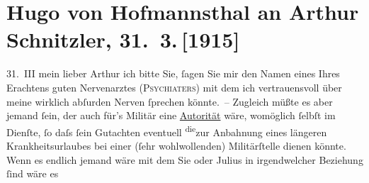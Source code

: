 

         
         \renewcommand{\erwaehntePersonen}{Personen: Hugo von Hofmannsthal, Hugo August von Hofmannsthal, Julius Schnitzler}
         \renewcommand{\erwaehnteOrte}{Orte: Rodaun, Wien}
         \renewcommand{\erwaehnteWerke}{}
               \section[Hugo von Hofmannsthal an Arthur Schnitzler, 31. 3. {[}1915{]}]{ Hugo von Hofmannsthal an Arthur Schnitzler, 31. 3. {[}1915{]}}\nopagebreak{}\rehead{ }\begin{ledgroupsized}[t]{13cm}\normalsize\beginnumbering{} \toendnotes[C]{\smallbreak\pagebreak[2]} 
\toendnotes[C]{\smallbreak}\pstart
           \raggedleft{}{\pb}31. III\pend
           \pstart{}mein lieber Arthur\pend\pstart
           ich bitte Sie, ſagen Sie mir den Namen eines Ihres Erachtens guten Nervenarztes (\textsc{Psychiaters}) mit dem ich vertrauensvoll über meine wirklich
               abſurden Nerven ſprechen könnte. – Zugleich müßte es aber jemand ſein, der auch für’s
               Militär eine \uline{Autorität} wäre, womöglich ſelbſt im
               Dienſte, ſo daſs ſein Gutachten eventuell \substVorne{}\textsuperscript{die}\substDazwischen{}zur\substHinten{} Anbahnung eines längeren Krankheitsurlaubes bei einer (ſehr wohlwollenden)
               Militärſtelle dienen könnte.\pend
           \pstart
           Wenn es endlich jemand wäre mit dem Sie  oder Julius in irgendwelcher Beziehung ſind wäre es

\end{ledgroupsized}
